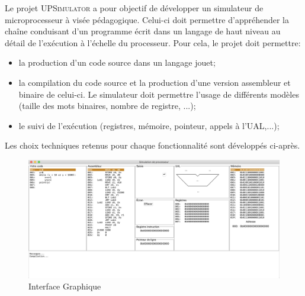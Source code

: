 Le projet \textsc{UPSimulator} a pour objectif de développer un simulateur de microprocesseur à visée pédagogique. Celui-ci doit permettre d'appréhender la chaîne conduisant d'un programme écrit dans un langage de haut niveau au détail de l'exécution à l'échelle du processeur. Pour cela, le projet doit permettre:
\begin{itemize}
	\item la production d'un code source dans un langage jouet;
	\item la compilation du code source et la production d'une version assembleur et binaire de celui-ci. Le simulateur doit permettre l'usage de différents modèles (taille des mots binaires, nombre de registre, ...);
	\item le suivi de l'exécution (registres, mémoire, pointeur, appels à l'UAL,...);
\end{itemize}

Les choix techniques retenus pour chaque fonctionnalité sont développés ci-après.

\begin{figure}[h!]
	\includegraphics[width=\textwidth]{./Pictures/Header.png}
	\caption{\label{fig:gui} Interface Graphique}
\end{figure}
